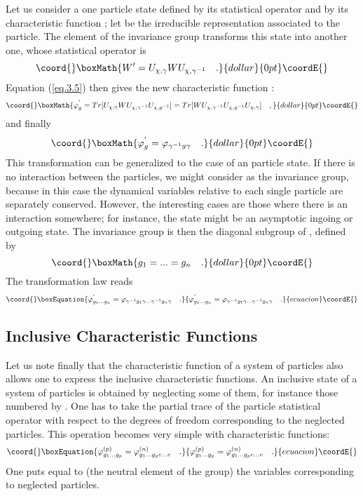 \documentclass[a4paper,11pt]{article}
\newcounter{num}
\def\Uc#1{U_{\chi,{#1}}}
\begin{document}
Let us consider a one particle state defined by its statistical operator \coordHE{} and by its 
characteristic function \myHighlight{$\phi$}\coordHE{}; let \myHighlight{$\chi$}\coordHE{} be the irreducible representation associated to the 
particle. 
The element \myHighlight{$\gamma$}\coordHE{} of the invariance group transforms this state into another one, whose 
statistical operator is
$$\coord{}\boxMath{
    W' = \Uc{\gamma} W \Uc{\gamma^{-1}}   \quad .
}{dollar}{0pt}\coordE{}$$
Equation (\ref{eq.3.5}) then gives  the new characteristic function \coordHE{} : 
$$\coord{}\boxMath{
   \phi^{'}_g = Tr[\Uc{\gamma} W \Uc{\gamma^{-1}} \Uc{g^{-1}} ]
             = Tr[W \Uc{\gamma^{-1}} \Uc{g^{-1}} \Uc{\gamma} ]  \quad ,
}{dollar}{0pt}\coordE{}$$
and finally
$$\coord{}\boxMath{
   \phi^{'}_g = \phi_{\gamma^{-1} g \gamma}   \quad .
}{dollar}{0pt}\coordE{}$$
This transformation can be generalized to the case of an \coordHE{} particle state. If there is no 
interaction between the particles, we might consider \coordHE{} as the invariance group, because in 
this case the dynamical variables relative to each single particle are separately conserved. 
However, the interesting cases are those where there is an interaction somewhere; for instance, 
the state might be an asymptotic ingoing or outgoing state. The invariance group is then the 
diagonal subgroup \coordHE{} of \coordHE{}, defined by
$$\coord{}\boxMath{
 g_1 = ... = g_n  \quad .
}{dollar}{0pt}\coordE{}$$
The transformation law reads
\begin{equation}\coord{}\boxEquation{
 \label{eq.5.3}
    \phi^{'}_{g_1 ... g_n} = \phi_{\gamma^{-1} g_1 \gamma ... \gamma^{-1} g_n \gamma }  \quad .
}{
 \phi^{'}_{g_1 ... g_n} = \phi_{\gamma^{-1} g_1 \gamma ... \gamma^{-1} g_n \gamma }  \quad .
}{ecuacion}\coordE{}\end{equation}

\subsection{Inclusive Characteristic Functions}

Let us note finally that the characteristic function of a system of particles also allows one 
to express the inclusive characteristic functions. An inclusive state of a system of \coordHE{} 
particles is obtained by neglecting some of them, for instance those numbered by \coordHE{}. 
One has to take the partial trace of the \coordHE{} particle statistical operator with respect to the 
degrees of freedom corresponding to the \coordHE{} neglected particles. This operation becomes 
very simple with characteristic functions:
\begin{equation}\coord{}\boxEquation{
 \label{eq.5.4}
    \phi^{(p)}_{g_1 ... g_p} = \phi^{(n)}_{g_1 ... g_p e ... e}  \quad .
}{
 \phi^{(p)}_{g_1 ... g_p} = \phi^{(n)}_{g_1 ... g_p e ... e}  \quad .
}{ecuacion}\coordE{}\end{equation}
One puts equal to \coordHE{} (the neutral element of the group) the variables corresponding to 
neglected particles.
\end{document}
